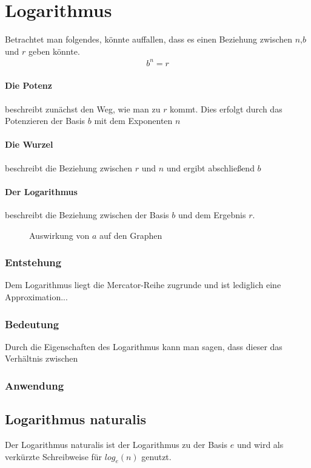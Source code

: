 \section{Logarithmus}\label{sec:E-Funktion/Logarithmus}
Betrachtet man folgendes, könnte auffallen, dass es einen Beziehung zwischen $n$,$b$ und $r$ geben könnte.  
\begin{align*}
	b^n=r
\end{align*}
\paragraph{Die Potenz} beschreibt zunächst den Weg, wie man zu $r$ kommt. Dies erfolgt durch das Potenzieren der Basis $b$ mit dem Exponenten $n$
\paragraph{Die Wurzel} beschreibt die Beziehung zwischen $r$ und $n$ und ergibt abschließend $b$
\paragraph{Der Logarithmus} beschreibt die Beziehung zwischen der Basis $b$ und dem Ergebnis $r$.
\begin{figure}
	\centering
	
	\caption{Auswirkung von $a$ auf den Graphen}
\end{figure}
\subsubsection{Entstehung}\label{sec:E-Funktion/Logarithmus/Entstehung}
Dem Logarithmus liegt die Mercator-Reihe zugrunde und ist lediglich eine Approximation... 
\subsubsection{Bedeutung}\label{sec:E-Funktion/Logarithmus/Bedeutung}
Durch die Eigenschaften des Logarithmus kann man sagen, dass dieser das Verhältnis zwischen 
\subsubsection{Anwendung}\label{sec:E-Funktion/Logarithmus/Anwendung}
\subsection{Logarithmus naturalis} Der Logarithmus naturalis ist der Logarithmus zu der Basis $e$ und wird als verkürzte Schreibweise für $log_e(n)$ genutzt. 
